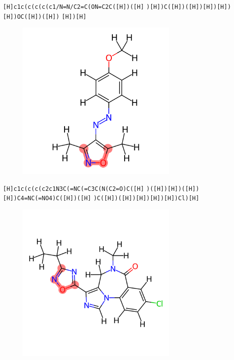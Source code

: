 \documentclass{beamer}
\begin{document}
\begin{frame}[fragile]
\verb|[H]c1c(c(c(c(c1/N=N/C2=C(ON=C2C([H])([H]|
\verb|)[H])C([H])([H])[H])[H])[H])OC([H])([H])|
\verb|[H])[H]|

\begin{figure}
    \includegraphics[width=0.7\textwidth,height=0.7\textheight,keepaspectratio]{mol00.png}
\end{figure}
\end{frame}
\begin{frame}[fragile]
\verb|[H]c1c(c(c(c2c1N3C(=NC(=C3C(N(C2=O)C([H]|
\verb|)([H])[H])([H])[H])C4=NC(=NO4)C([H])([H]|
\verb|)C([H])([H])[H])[H])[H])Cl)[H]|

\begin{figure}
    \includegraphics[width=0.7\textwidth,height=0.7\textheight,keepaspectratio]{mol01.png}
\end{figure}
\end{frame}
\end{document}
